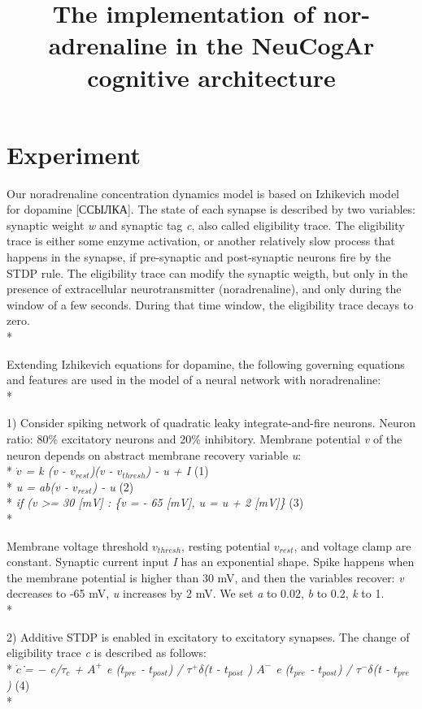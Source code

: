 \documentclass[oribibl]{llncs}
\begin{document}
\title{The implementation of nor-adrenaline in the NeuCogAr cognitive architecture}

\section{Experiment}\label{the-details}


Our noradrenaline concentration dynamics model is based on Izhikevich model for dopamine [ССЫЛКА]. The state of each synapse is described by two variables: synaptic weight \textit{w} and synaptic tag \textit{c}, also called eligibility trace. The eligibility trace is either some enzyme activation, or another relatively slow process that happens in the synapse, if pre-synaptic and post-synaptic neurons fire by the STDP rule. The eligibility trace can modify the synaptic weigth, but only in the presence of extracellular neurotransmitter (noradrenaline), and only during the window of a few seconds. During that time window, the eligibility trace decays to zero.\\*


Extending Izhikevich equations for dopamine, the following governing equations and features are used in the model of a neural network with noradrenaline: \\*

1) Consider spiking network of quadratic leaky integrate-and-fire neurons. Neuron ratio: 80\% excitatory neurons and 20\% inhibitory. Membrane potential \textit{v} of the neuron depends on abstract membrane recovery variable \textit{u}: \\*
\textit{$\dot{v}$ = k (v - $v_{rest}$)(v - $v_{thresh}$) - u + I} (1) \\*
\textit{u =  ab(v - $v_{rest}$) - u} (2) \\*
\textit{if (v >= 30 [mV] : \{v = - 65 [mV], u = u + 2 [mV]\}} (3) \\*

Membrane voltage threshold \textit{$v_{thresh}$}, resting potential \textit{$v_{rest}$}, and voltage clamp are constant. Synaptic current input \textit{I} has an exponential shape. Spike happens when the membrane potential is higher than 30 mV, and then the variables recover: \textit{v} decreases to -65 mV, \textit{u} increases by 2 mV. We set \textit{a} to 0.02, \textit{b} to 0.2, \textit{k} to 1. \\*

2) Additive STDP is enabled in excitatory to excitatory synapses. The change of eligibility trace \textit{c} is described as follows: \\*
\textit{$\dot{c}$˙= − c/$\tau_c$ + $A^+$  e ($t_{pre}$ - $t_{post}$) / $\tau^+$$\delta$(t - $t_{post}$ )  $A^-$ e  ($t_{pre}$ - $t_{post}$) / $\tau^-$$\delta$(t - $t_{pre}$ )}	(4) \\*
\end{document}

